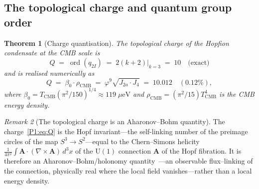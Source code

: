 \documentclass[11pt,a4paper]{article}
\newtheorem{theorem}{Theorem}[section]
\theoremstyle{definition}
\theoremstyle{remark}
\newtheorem{remark}[theorem]{Remark}
\newcommand{\vp}{\varphi}
\newcommand{\bz}{\beta_{0}}
\newcommand{\Ja}{J_{2a}}
\newcommand{\Jfour}{J_{4}}
\newcommand{\TCMB}{T_{\mathrm{CMB}}}
\newcommand{\rCMB}{\rho_{\mathrm{CMB}}}
\newcommand{\ord}{\operatorname{ord}}
\begin{document}
\subsection{The topological charge and quantum group order}
 
\begin{theorem}[Charge quantisation]
\label{P1:thm:charge_q10}
The topological charge of the Hopfion condensate at the CMB scale is
\begin{equation}
  Q \;=\; \ord(q_{2I}) \;=\; 2(k+2)\big|_{k=3} \;=\; 10 \quad\text{(exact)}
  \label{P1:eq:Q}
\end{equation}
and is realised numerically as
\begin{equation}
  Q \;=\; \bz\cdot\rCMB \;=\; \vp^{9}\sqrt{\Ja\cdot\Jfour} \;=\; 10.012
  \quad(0.12\%),
  \label{P1:eq:br10}
\end{equation}
where $\bz = \TCMB(\pi^2/150)^{1/4} \approx 119\;\mu\text{eV}$ and
$\rCMB = (\pi^2/15)\TCMB^4$ is the CMB energy density.
\end{theorem}

\begin{remark}[The topological charge is an Aharonov--Bohm quantity]
\label{P1:rem:hopf_ab}
The charge~\eqref{P1:eq:Q} is the Hopf invariant---the self-linking number of the
preimage circles of the map $S^3\to S^2$---equal to the Chern--Simons helicity
$\tfrac{1}{4\pi^2}\!\int\!\mathbf{A}\cdot(\nabla\times\mathbf{A})\,d^3x$ of the
$\mathrm{U}(1)$ connection $\mathbf{A}$ of the Hopf fibration. It is therefore an
Aharonov--Bohm/holonomy quantity~\cite{AharonovBohm1959}---an observable flux--linking of the connection,
physically real where the local field vanishes---rather than a local energy density.
\end{remark}
 
\end{document}
